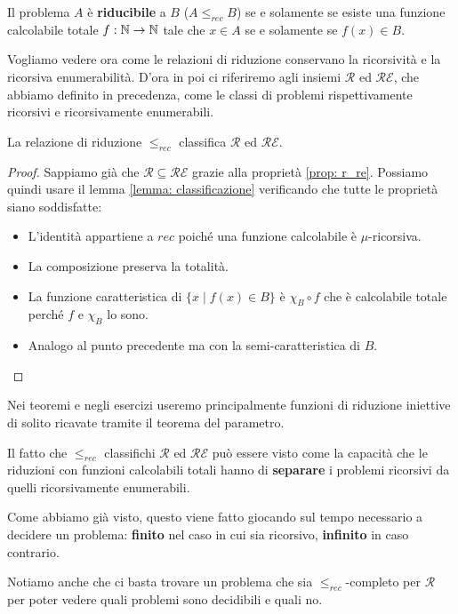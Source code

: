 \begin{definition}
	Il problema $A$ è \textbf{riducibile} a $B$ ($A \leq_{rec} B$)
	se e solamente se esiste una funzione calcolabile totale
	$f : \mathbb{N} \to \mathbb{N}$ tale che $x \in A$ se e solamente se
	$f(x) \in B$.
\end{definition}

Vogliamo vedere ora come le relazioni di riduzione conservano la
ricorsività e la ricorsiva enumerabilità. D'ora in poi ci
riferiremo agli insiemi $\mathcal{R}$ ed $\mathcal{RE}$, che
abbiamo definito in precedenza, come le classi di problemi
rispettivamente ricorsivi e ricorsivamente enumerabili.

\begin{theorem}
	La relazione di riduzione $\leq_{rec}$ classifica
	$\mathcal{R}$ ed $\mathcal{RE}$.
	\begin{proof}
		Sappiamo già che $\mathcal{R} \subseteq \mathcal{RE}$
		grazie alla proprietà \ref{prop: r_re}. Possiamo quindi
		usare il lemma \ref{lemma: classificazione} verificando
		che tutte le proprietà siano soddisfatte:
		\begin{itemize}
			\item L'identità appartiene a $rec$ poiché una
			      funzione calcolabile è $\mu$-ricorsiva.
			\item La composizione preserva la totalità.
			\item La funzione caratteristica di
			      $\{ x \mid f(x) \in B \}$ è $\chi_B \circ f$
			      che è calcolabile totale perché $f$ e $\chi_B$
			      lo sono.
			\item Analogo al punto precedente ma con la
			      semi-caratteristica di $B$.
		\end{itemize}
	\end{proof}
\end{theorem}

Nei teoremi e negli esercizi useremo principalmente funzioni
di riduzione iniettive di solito ricavate tramite il teorema
del parametro.

Il fatto che $\leq_{rec}$ classifichi $\mathcal{R}$ ed
$\mathcal{RE}$ può essere visto come la capacità che le
riduzioni con funzioni calcolabili totali hanno di
\textbf{separare} i problemi ricorsivi da quelli ricorsivamente
enumerabili.

Come abbiamo già visto, questo viene fatto giocando sul tempo
necessario a decidere un problema: \textbf{finito} nel caso
in cui sia ricorsivo, \textbf{infinito} in caso contrario.

Notiamo anche che ci basta trovare un problema che sia
$\leq_{rec}$-completo per $\mathcal{R}$ per poter vedere quali
problemi sono decidibili e quali no.


